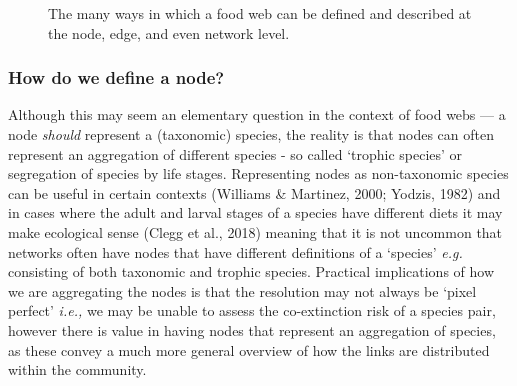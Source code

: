 \documentclass[
]{article}
\begin{document}
\begin{figure}


\caption{\label{fig-anatomy}The many ways in which a food web can be
defined and described at the node, edge, and even network level.}

\end{figure}%

\subsubsection{How do we define a node?}\label{how-do-we-define-a-node}

Although this may seem an elementary question in the context of food
webs --- a node \emph{should} represent a (taxonomic) species, the
reality is that nodes can often represent an aggregation of different
species - so called `trophic species' or segregation of species by life
stages. Representing nodes as non-taxonomic species can be useful in
certain contexts (Williams \& Martinez, 2000; Yodzis, 1982) and in cases
where the adult and larval stages of a species have different diets it
may make ecological sense (Clegg et al., 2018) meaning that it is not
uncommon that networks often have nodes that have different definitions
of a `species' \emph{e.g.} consisting of both taxonomic and trophic
species. Practical implications of how we are aggregating the nodes is
that the resolution may not always be `pixel perfect' \emph{i.e.,} we
may be unable to assess the co-extinction risk of a species pair,
however there is value in having nodes that represent an aggregation of
species, as these convey a much more general overview of how the links
are distributed within the community.
\end{document}
